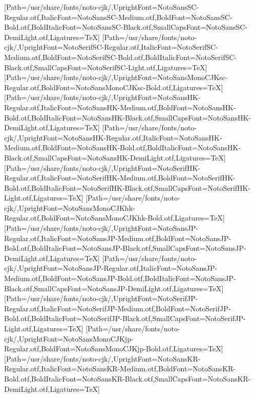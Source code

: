 \newfontfamily{}[Path=/usr/share/fonts/noto-cjk/,UprightFont=NotoSansSC-Regular.otf,ItalicFont=NotoSansSC-Medium.otf,BoldFont=NotoSansSC-Bold.otf,BoldItalicFont=NotoSansSC-Black.otf,SmallCapsFont=NotoSansSC-DemiLight.otf,Ligatures=TeX]
\newfontfamily{}[Path=/usr/share/fonts/noto-cjk/,UprightFont=NotoSerifSC-Regular.otf,ItalicFont=NotoSerifSC-Medium.otf,BoldFont=NotoSerifSC-Bold.otf,BoldItalicFont=NotoSerifSC-Black.otf,SmallCapsFont=NotoSerifSC-Light.otf,Ligatures=TeX]
\newfontfamily{}[Path=/usr/share/fonts/noto-cjk/,UprightFont=NotoSansMonoCJKsc-Regular.otf,BoldFont=NotoSansMonoCJKsc-Bold.otf,Ligatures=TeX]
\newfontfamily{}[Path=/usr/share/fonts/noto-cjk/,UprightFont=NotoSansHK-Regular.otf,ItalicFont=NotoSansHK-Medium.otf,BoldFont=NotoSansHK-Bold.otf,BoldItalicFont=NotoSansHK-Black.otf,SmallCapsFont=NotoSansHK-DemiLight.otf,Ligatures=TeX]
\newfontfamily{}[Path=/usr/share/fonts/noto-cjk/,UprightFont=NotoSansHK-Regular.otf,ItalicFont=NotoSansHK-Medium.otf,BoldFont=NotoSansHK-Bold.otf,BoldItalicFont=NotoSansHK-Black.otf,SmallCapsFont=NotoSansHK-DemiLight.otf,Ligatures=TeX]
\newfontfamily{}[Path=/usr/share/fonts/noto-cjk/,UprightFont=NotoSerifHK-Regular.otf,ItalicFont=NotoSerifHK-Medium.otf,BoldFont=NotoSerifHK-Bold.otf,BoldItalicFont=NotoSerifHK-Black.otf,SmallCapsFont=NotoSerifHK-Light.otf,Ligatures=TeX]
\newfontfamily{}[Path=/usr/share/fonts/noto-cjk/,UprightFont=NotoSansMonoCJKhk-Regular.otf,BoldFont=NotoSansMonoCJKhk-Bold.otf,Ligatures=TeX]
\newfontfamily{}[Path=/usr/share/fonts/noto-cjk/,UprightFont=NotoSansJP-Regular.otf,ItalicFont=NotoSansJP-Medium.otf,BoldFont=NotoSansJP-Bold.otf,BoldItalicFont=NotoSansJP-Black.otf,SmallCapsFont=NotoSansJP-DemiLight.otf,Ligatures=TeX]
\newfontfamily{}[Path=/usr/share/fonts/noto-cjk/,UprightFont=NotoSansJP-Regular.otf,ItalicFont=NotoSansJP-Medium.otf,BoldFont=NotoSansJP-Bold.otf,BoldItalicFont=NotoSansJP-Black.otf,SmallCapsFont=NotoSansJP-DemiLight.otf,Ligatures=TeX]
\newfontfamily{}[Path=/usr/share/fonts/noto-cjk/,UprightFont=NotoSerifJP-Regular.otf,ItalicFont=NotoSerifJP-Medium.otf,BoldFont=NotoSerifJP-Bold.otf,BoldItalicFont=NotoSerifJP-Black.otf,SmallCapsFont=NotoSerifJP-Light.otf,Ligatures=TeX]
\newfontfamily{}[Path=/usr/share/fonts/noto-cjk/,UprightFont=NotoSansMonoCJKjp-Regular.otf,BoldFont=NotoSansMonoCJKjp-Bold.otf,Ligatures=TeX]
\newfontfamily{}[Path=/usr/share/fonts/noto-cjk/,UprightFont=NotoSansKR-Regular.otf,ItalicFont=NotoSansKR-Medium.otf,BoldFont=NotoSansKR-Bold.otf,BoldItalicFont=NotoSansKR-Black.otf,SmallCapsFont=NotoSansKR-DemiLight.otf,Ligatures=TeX]
